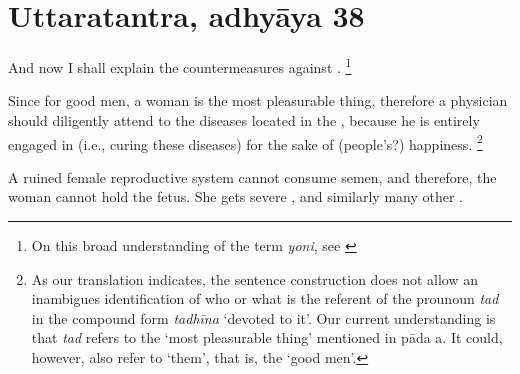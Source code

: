 
\section{Uttaratantra, adhyāya 38}

\begin{translation}

\item [1] And now I shall explain the countermeasures against .%
	\footnote{%
	On this broad understanding of the term \textit{yoni}, see \cite[pp.\ 572--5]{das-orig}}

\item [2] Since for good men, a woman is the most pleasurable thing, therefore a physician should diligently attend to the diseases located in the , because he is entirely engaged in (i.e., curing these diseases) for the sake of (people's?) happiness.%
	\footnote{%
	As our translation indicates, the sentence construction does not allow an inambigues identification of who or what is the referent of the prounoun \textit{tad} in the compound form \textit{tadhīna} ‘devoted to it’. Our current understanding is that \textit{tad} refers to the ‘most pleasurable thing’ mentioned in pāda a. It could, however, also refer to ‘them’, that is, the ‘good men’.%
	}

\item [3] A ruined female reproductive system cannot consume semen, and therefore, the woman cannot hold the fetus. She gets severe ,  and similarly many other .


\end{translation}
